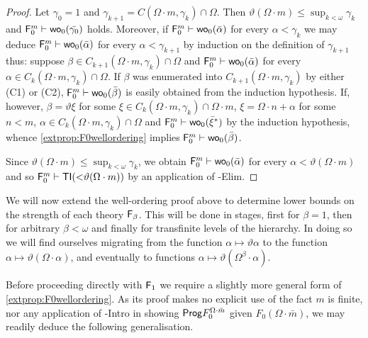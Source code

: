 \documentclass[UKenglish,cleveref,DIV=12]{scrartcl}
\theoremstyle{definition}
\theoremstyle{definition}
\begin{document}
\begin{proof}
Let $\gamma_0=1$ and $\gamma_{k+1}= C(\Omega\cdot m,\gamma_k)\cap\Omega$. Then
$\vartheta(\Omega\cdot m)\le\sup_{k<\omega}\gamma_k$ and
$\mathsf{F}_0^m\vdash\mathsf{wo}_0(\bar{\gamma_0})$ holds. Moreover, if $\mathsf{F}_0^m\vdash
\mathsf{wo}_0(\bar{\alpha})$ for every $\alpha<\gamma_k$ we may deduce $\mathsf{F}_0^m\vdash
\mathsf{wo}_0(\bar{\alpha})$ for every $\alpha<\gamma_{k+1}$ by induction on the
definition of $\gamma_{k+1}$ thus: suppose $\beta\in C_{k+1}(\Omega\cdot
m,\gamma_k)\cap\Omega$ and $\mathsf{F}_0^m\vdash \mathsf{wo}_0(\bar\alpha)$ for every
$\alpha\in C_{k}(\Omega\cdot m,\gamma_k)\cap\Omega$. If $\beta$ was enumerated
into $C_{k+1}(\Omega\cdot m,\gamma_k)$ by either (C1) or (C2),
$\mathsf{F}_0^m\vdash\mathsf{wo}_0(\bar\beta)$ is easily obtained from the induction
hypothesis. If, however, $\beta=\vartheta\xi$ for some $\xi\in C_{k}(\Omega\cdot
m,\gamma_k)\cap\Omega\cdot m$, $\xi=\Omega\cdot n+\alpha$ for some $n<m$,
$\alpha\in C_{k}(\Omega\cdot m,\gamma_k)\cap\Omega$ and
$\mathsf{F}_0^m\vdash\mathsf{wo}_0(\bar\xi^*)$ by the induction hypothesis, whence
\cref{extprop:F0wellordering} implies $\mathsf{F}_0^m\vdash\mathsf{wo}_0(\bar\beta)$.

Since $\vartheta(\Omega\cdot m)\le\sup_{k<\omega}\gamma_k$, we obtain
$\mathsf{F}_0^m\vdash\mathsf{wo}_0(\bar\alpha)$ for every $\alpha<\vartheta(\Omega\cdot m)$ and
so $\mathsf{F}_0^m\vdash\mathsf{TI}(\mathord<\vartheta(\Omega\cdot m))$ by an application of
-Elim.
\end{proof}

We will now extend the well-ordering proof above to determine lower bounds on the strength of each
theory $\mathsf{F}_\beta$. This will be done in stages, first for $\beta=1$, then for
arbitrary $\beta<\omega$ and finally for transfinite levels of the hierarchy. In
doing so we will find ourselves migrating from the function $\alpha\mapsto\vartheta\alpha$
to the function $\alpha\mapsto\vartheta(\Omega\cdot\alpha)$,
and eventually to functions $\alpha\mapsto\vartheta(\Omega^{\beta}\cdot\alpha)$.

Before proceeding directly with $\mathsf{F}_1$ we require a slightly more general form
of \cref{extprop:F0wellordering}. As its proof makes no explicit use of the fact $m$ is finite,
nor any application of -Intro in showing $\mathsf{Prog} F^{\Omega\cdot \bar m}_0$ given
$F_0(\Omega\cdot\bar m)$, we may readily deduce the following generalisation.
\end{document}
